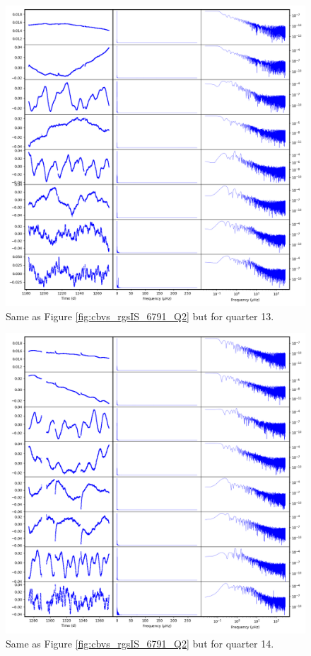 \begin{figure}
    \centering
    \includegraphics[width=\linewidth]{Chapter_Appended/AppB/cbv_6791_rgs_q13.png}
    \caption{Same as Figure \ref{fig:cbvs_rgsIS_6791_Q2} but for quarter 13.}
    \label{fig:cbvs_rgsIS_6791_Q13}
\end{figure}


\begin{figure}
    \centering
    \includegraphics[width=\linewidth]{Chapter_Appended/AppB/cbv_6791_rgs_q14.png}
    \caption{Same as Figure \ref{fig:cbvs_rgsIS_6791_Q2} but for quarter 14.}
    \label{fig:cbvs_rgsIS_6791_Q14}
\end{figure}



